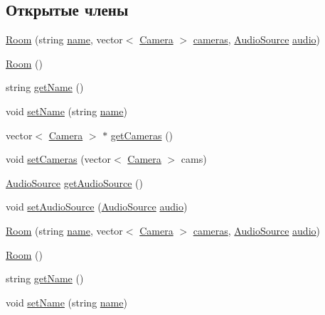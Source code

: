 \subsection*{Открытые члены}
\begin{DoxyCompactItemize}
\item 
\hyperlink{class_room_a545e0b1d59ba66d72691c0dec993d9f0}{Room} (string \hyperlink{class_room_ae75204d685fe893bf4c867f9f3a79eb3}{name}, vector$<$ \hyperlink{struct_camera}{Camera} $>$ \hyperlink{class_room_a3e2ec3339b74eccacc2946d42151efc1}{cameras}, \hyperlink{struct_audio_source}{Audio\+Source} \hyperlink{class_room_a09874479cea41dde79c7c8dfdbd1703c}{audio})
\item 
\hyperlink{class_room_ac6ef93a7d9c3e1d624e025058d5f16ff}{Room} ()
\item 
string \hyperlink{class_room_a5701522ecf180c978eaa454d79f3e305}{get\+Name} ()
\item 
void \hyperlink{class_room_a3b4c4c8f33572ff196d75a187ed98021}{set\+Name} (string \hyperlink{class_room_ae75204d685fe893bf4c867f9f3a79eb3}{name})
\item 
vector$<$ \hyperlink{struct_camera}{Camera} $>$ $\ast$ \hyperlink{class_room_a4a67443ce377dda8f71d862428a31ef1}{get\+Cameras} ()
\item 
void \hyperlink{class_room_ae105a370ebb1cdded2254d39c547a5fd}{set\+Cameras} (vector$<$ \hyperlink{struct_camera}{Camera} $>$ cams)
\item 
\hyperlink{struct_audio_source}{Audio\+Source} \hyperlink{class_room_ad99b6c39b3322dc0f28ce31c35402bb9}{get\+Audio\+Source} ()
\item 
void \hyperlink{class_room_ae51a48335bf154e1194c1acc2fa16813}{set\+Audio\+Source} (\hyperlink{struct_audio_source}{Audio\+Source} \hyperlink{class_room_a09874479cea41dde79c7c8dfdbd1703c}{audio})
\item 
\hyperlink{class_room_a545e0b1d59ba66d72691c0dec993d9f0}{Room} (string \hyperlink{class_room_ae75204d685fe893bf4c867f9f3a79eb3}{name}, vector$<$ \hyperlink{struct_camera}{Camera} $>$ \hyperlink{class_room_a3e2ec3339b74eccacc2946d42151efc1}{cameras}, \hyperlink{struct_audio_source}{Audio\+Source} \hyperlink{class_room_a09874479cea41dde79c7c8dfdbd1703c}{audio})
\item 
\hyperlink{class_room_ac6ef93a7d9c3e1d624e025058d5f16ff}{Room} ()
\item 
string \hyperlink{class_room_a5701522ecf180c978eaa454d79f3e305}{get\+Name} ()
\item 
void \hyperlink{class_room_a3b4c4c8f33572ff196d75a187ed98021}{set\+Name} (string \hyperlink{class_room_ae75204d685fe893bf4c867f9f3a79eb3}{name})

\end{DoxyCompactItemize}
